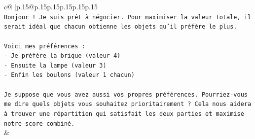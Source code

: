 \documentclass{article}
\begin{document}
{\begin{supertabular}{c@{$\;$}|p{.15\linewidth}@{}p{.15\linewidth}p{.15\linewidth}p{.15\linewidth}p{.15\linewidth}p{.15\linewidth}}
{{{\\ 
\texttt{Bonjour ! Je suis prêt à négocier. Pour maximiser la valeur totale, il serait idéal que chacun obtienne les objets qu'il préfère le plus.} \\
\\ 
\texttt{Voici mes préférences :} \\
\texttt{{-} Je préfère la brique (valeur 4)} \\
\texttt{{-} Ensuite la lampe (valeur 3)} \\
\texttt{{-} Enfin les boulons (valeur 1 chacun)} \\
\\ 
\texttt{Je suppose que vous avez aussi vos propres préférences. Pourriez{-}vous me dire quels objets vous souhaitez prioritairement ? Cela nous aidera à trouver une répartition qui satisfait les deux parties et maximise notre score combiné.} \\
            }
        }
    }
    & \\ \\


\end{supertabular}}
\end{document}
